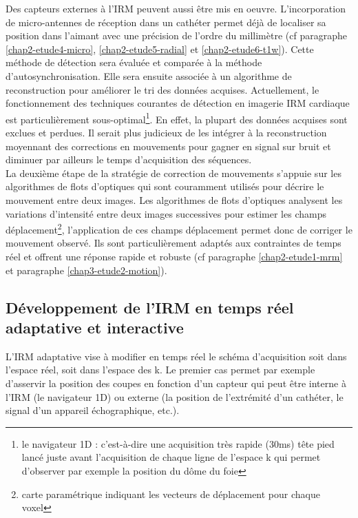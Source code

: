 \documentclass[10pt,a4paper]{report}
\begin{document}
Des capteurs externes à l’IRM peuvent aussi être mis en oeuvre. L’incorporation de micro-antennes de réception dans un cathéter permet déjà de localiser sa position dans l’aimant avec une précision de l’ordre du millimètre (cf paragraphe \ref{chap2-etude4-micro}, \ref{chap2-etude5-radial} et \ref{chap2-etude6-t1w}). Cette méthode de détection sera évaluée et comparée à la méthode d’autosynchronisation. Elle sera ensuite associée à un algorithme de reconstruction pour améliorer le tri des données acquises. Actuellement, le fonctionnement des techniques courantes de détection en imagerie IRM cardiaque est particulièrement sous-optimal\footnote{le navigateur 1D : c’est-à-dire une acquisition très rapide (30ms) tête pied lancé juste avant l’acquisition de chaque ligne de l’espace k qui permet d’observer par exemple la position du dôme du foie}. En effet, la plupart des données acquises sont exclues et perdues. Il serait plus judicieux de les intégrer à la reconstruction moyennant des corrections en mouvements pour gagner en signal sur bruit et diminuer par ailleurs le temps d’acquisition des séquences.\\

La deuxième étape de la stratégie de correction de mouvements s’appuie sur les algorithmes de flots d’optiques qui sont couramment utilisés pour décrire le mouvement entre deux images. Les algorithmes de flots d’optiques analysent les variations d’intensité entre deux images successives pour estimer les champs déplacement\footnote{carte paramétrique indiquant les vecteurs de déplacement pour chaque voxel}, l’application de ces champs déplacement permet donc de corriger le mouvement observé. Ils sont particulièrement adaptés aux contraintes de temps réel et offrent une réponse rapide et robuste (cf paragraphe \ref{chap2-etude1-mrm} et paragraphe \ref{chap3-etude2-motion}).\\

\subsection{Développement de l’IRM en temps réel adaptative et interactive}

L’IRM adaptative vise à modifier en temps réel le schéma d’acquisition soit dans l’espace réel, soit dans l’espace des k. Le premier cas permet par exemple d’asservir la position des coupes en fonction d’un capteur qui peut être interne à l’IRM (le navigateur 1D) ou externe (la position de l’extrémité d’un cathéter, le signal d’un appareil échographique, etc.).\\
\end{document}
